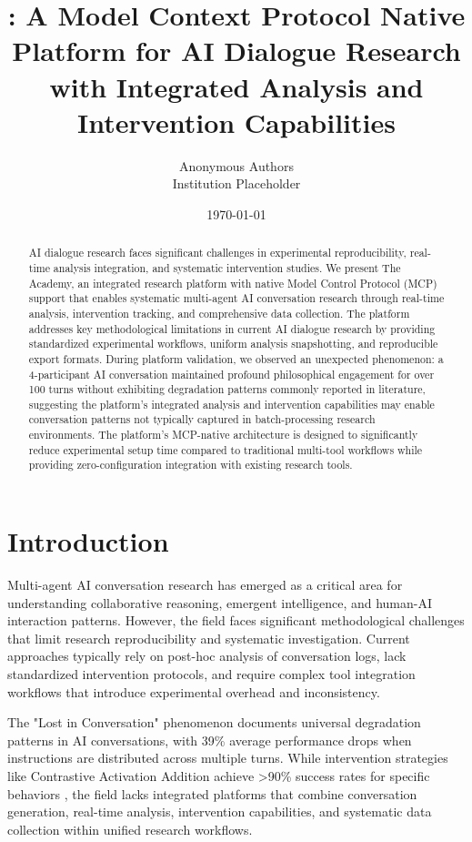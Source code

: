 \documentclass[11pt,letterpaper]{article}
\title{\theacademy{}: A Model Context Protocol Native Platform for AI Dialogue Research with Integrated Analysis and Intervention Capabilities}
\author{
Anonymous Authors \\
Institution Placeholder
}
\date{\today}
\newcommand{\theacademy}{The Academy}
\newcommand{\mcp}{MCP}
\begin{document}
\maketitle

\begin{abstract}
AI dialogue research faces significant challenges in experimental reproducibility, real-time analysis integration, and systematic intervention studies. We present \theacademy{}, an integrated research platform with native Model Control Protocol (\mcp{}) support that enables systematic multi-agent AI conversation research through real-time analysis, intervention tracking, and comprehensive data collection. The platform addresses key methodological limitations in current AI dialogue research by providing standardized experimental workflows, uniform analysis snapshotting, and reproducible export formats. During platform validation, we observed an unexpected phenomenon: a 4-participant AI conversation maintained profound philosophical engagement for over 100 turns without exhibiting degradation patterns commonly reported in literature, suggesting the platform's integrated analysis and intervention capabilities may enable conversation patterns not typically captured in batch-processing research environments. The platform's \mcp{}-native architecture is designed to significantly reduce experimental setup time compared to traditional multi-tool workflows while providing zero-configuration integration with existing research tools.
\end{abstract}

\section{Introduction}

Multi-agent AI conversation research has emerged as a critical area for understanding collaborative reasoning, emergent intelligence, and human-AI interaction patterns. However, the field faces significant methodological challenges that limit research reproducibility and systematic investigation. Current approaches typically rely on post-hoc analysis of conversation logs, lack standardized intervention protocols, and require complex tool integration workflows that introduce experimental overhead and inconsistency.

The "Lost in Conversation" phenomenon \citep{laban2025lost} documents universal degradation patterns in AI conversations, with 39\% average performance drops when instructions are distributed across multiple turns. While intervention strategies like Contrastive Activation Addition achieve >90\% success rates for specific behaviors \citep{panickssery2024activation}, the field lacks integrated platforms that combine conversation generation, real-time analysis, intervention capabilities, and systematic data collection within unified research workflows.
\end{document}
